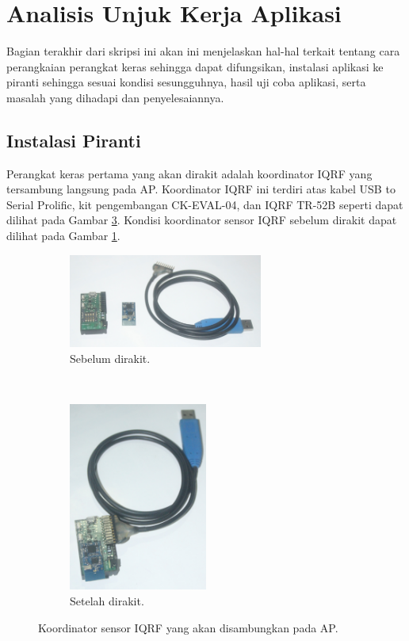 	\section{Analisis Unjuk Kerja Aplikasi}
		Bagian terakhir dari skripsi ini akan ini menjelaskan hal-hal terkait tentang cara perangkaian perangkat keras sehingga dapat difungsikan, instalasi aplikasi ke piranti sehingga sesuai kondisi sesungguhnya, hasil uji coba aplikasi, serta masalah yang dihadapi dan penyelesaiannya.

		\subsection{Instalasi Piranti}
			Perangkat keras pertama yang akan dirakit adalah koordinator IQRF yang tersambung langsung pada AP. Koordinator IQRF ini terdiri atas kabel USB to Serial Prolific, kit pengembangan CK-EVAL-04, dan IQRF TR-52B seperti dapat dilihat pada Gambar \ref{iqrf-coordinator}. Kondisi koordinator sensor IQRF sebelum dirakit dapat dilihat pada Gambar \ref{iqrf-stripped}.

			\begin{figure}[H]
				\begin{subfigure}[b]{\textwidth}
					\centering
				    \includegraphics[width=0.7\textwidth]{gambar/iqrf-stripped}
				    \caption{Sebelum dirakit.}
				    \label{iqrf-stripped}
				\end{subfigure}
				 ~
				\begin{subfigure}[b]{\textwidth}
					\centering
				    \includegraphics[width=0.5\textwidth]{gambar/iqrf-complete}
				    \caption{Setelah dirakit.}
				    \label{iqrf-complete}
				\end{subfigure}
				\caption{Koordinator sensor IQRF yang akan disambungkan pada AP.}
				\label{iqrf-coordinator}
			\end{figure}

